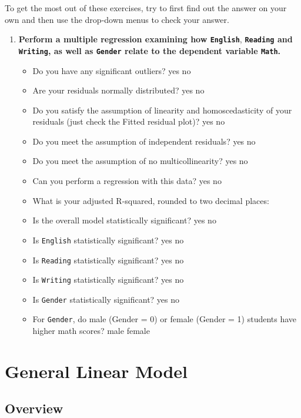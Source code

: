 \documentclass[
]{book}
\begin{document}
To get the most out of these exercises, try to first find out the answer on your own and then use the drop-down menus to check your answer.

\begin{enumerate}
\def\labelenumi{\arabic{enumi}.}
\item
  \textbf{Perform a multiple regression examining how \texttt{English}}, \textbf{\texttt{Reading} and \texttt{Writing}, as well as \texttt{Gender} relate to the dependent variable \texttt{Math}.}

  \begin{itemize}
  \item
    Do you have any significant outliers? yes no
  \item
    Are your residuals normally distributed? yes no
  \item
    Do you satisfy the assumption of linearity and homoscedasticity of your residuals (just check the Fitted residual plot)? yes no
  \item
    Do you meet the assumption of independent residuals? yes no
  \item
    Do you meet the assumption of no multicollinearity? yes no
  \item
    Can you perform a regression with this data? yes no
  \item
    What is your adjusted R-squared, rounded to two decimal places:
  \item
    Is the overall model statistically significant? yes no
  \item
    Is \texttt{English} statistically significant? yes no
  \item
    Is \texttt{Reading} statistically significant? yes no
  \item
    Is \texttt{Writing} statistically significant? yes no
  \item
    Is \texttt{Gender} statistically significant? yes no
  \item
    For \texttt{Gender}, do male (Gender = 0) or female (Gender = 1) students have higher math scores? male female
  \end{itemize}
\end{enumerate}

\hypertarget{general-linear-model}{%
\section{General Linear Model}\label{general-linear-model}}

\hypertarget{overview-12}{%
\subsection{Overview}\label{overview-12}}
\end{document}

